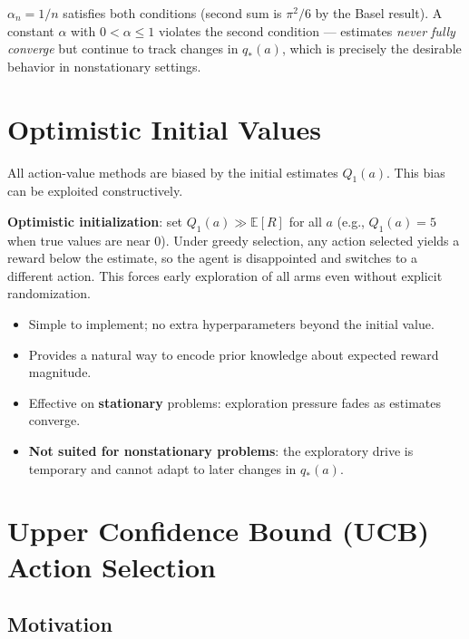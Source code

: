 \documentclass[11pt,a4paper]{article}
\theoremstyle{definition}
\theoremstyle{plain}
\theoremstyle{remark}
\begin{document}
$\alpha_n = 1/n$ satisfies both conditions (second sum is $\pi^2/6$ by the Basel result). A constant $\alpha$ with $0 < \alpha \le 1$ violates the second condition — estimates \emph{never fully converge} but continue to track changes in $q_*(a)$, which is precisely the desirable behavior in nonstationary settings.

\section{Optimistic Initial Values}

All action-value methods are biased by the initial estimates $Q_1(a)$. This bias can be exploited constructively.

\textbf{Optimistic initialization}: set $Q_1(a) \gg \mathbb{E}[R]$ for all $a$ (e.g., $Q_1(a) = 5$ when true values are near 0). Under greedy selection, any action selected yields a reward below the estimate, so the agent is disappointed and switches to a different action. This forces early exploration of all arms even without explicit randomization.

\begin{tcolorbox}[colback=blue!5!white,colframe=blue!60!black,title=\textbf{Properties of Optimistic Initialization}]
\begin{itemize}
    \item Simple to implement; no extra hyperparameters beyond the initial value.
    \item Provides a natural way to encode prior knowledge about expected reward magnitude.
    \item Effective on \textbf{stationary} problems: exploration pressure fades as estimates converge.
    \item \textbf{Not suited for nonstationary problems}: the exploratory drive is temporary and cannot adapt to later changes in $q_*(a)$.
\end{itemize}
\end{tcolorbox}

\section{Upper Confidence Bound (UCB) Action Selection}

\subsection{Motivation}
\end{document}
